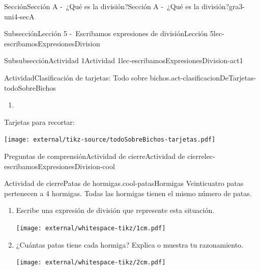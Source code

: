 \begin{sectionptx}{Sección}{Sección A -~¿Qué es la división?}{}{Sección A -~¿Qué es la división?}{}{}{gra3-uni4-secA}
\begin{subsectionptx}{Subsección}{Lección 5 -~Escribamos expresiones de división}{}{Lección 5}{}{}{lec-escribamosExpresionesDivision}
\begin{subsubsectionptx}{Subsubsección}{Actividad 1}{}{Actividad 1}{}{}{lec-escribamosExpresionesDivision-act1}
\begin{activity}{Actividad}{Clasificación de tarjetas: Todo sobre bichos.}{act-clasificacionDeTarjetas-todoSobreBichos}
\begin{enumerate}
\begin{enumerate}[label={\Alph*.}]
\begin{image}{0}{1}{0}{}
\texttt{[image: external/whitespace-tikz/1cm.pdf]}
\end{image}%
%
\item{}%
%
\end{enumerate}
\end{enumerate}
\end{activity}%
\begin{cutoutpage}
Tarjetas para recortar:%
\vspace{2cm}
\begin{image}{0}{1}{0}{}%
\texttt{[image: external/tikz-source/todoSobreBichos-tarjetas.pdf]}
\end{image}%
\end{cutoutpage}
\end{subsubsectionptx}
%
%
\typeout{************************************************}
\typeout{************************************************}
%
\begin{reading-questions-subsubsection}{Preguntas de comprensión}{Actividad de cierre}{}{Actividad de cierre}{}{}{lec-escribamosExpresionesDivision-cool}
\begin{project}{Actividad de cierre}{Patas de hormigas.}{cool-patasHormigas}%
Veinticuatro patas pertenecen a 4 hormigas. Todas las hormigas tienen el mismo número de patas.%
\par
%
\begin{enumerate}[label={(\alph*)}]
\item{}Escribe una expresión de división que represente esta situación.%
\begin{image}{0}{1}{0}{}%
\texttt{[image: external/whitespace-tikz/1cm.pdf]}
\end{image}%
\item{}¿Cuántas patas tiene cada hormiga? Explica o muestra tu razonamiento.%
\begin{image}{0}{1}{0}{}%
\texttt{[image: external/whitespace-tikz/2cm.pdf]}
\end{image}%
\end{enumerate}
%
\end{project}%
\end{reading-questions-subsubsection}
\end{subsectionptx}
%
%
\typeout{************************************************}

\end{sectionptx}
